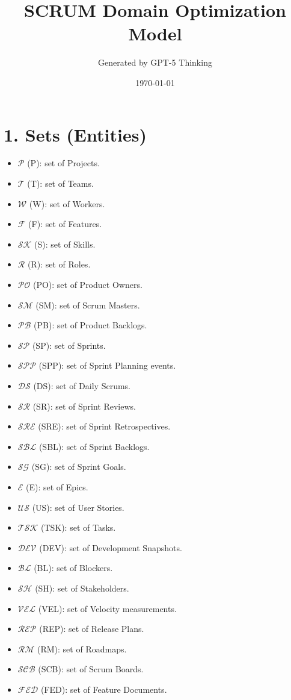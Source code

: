 \documentclass[11pt,a4paper]{article}
\title{SCRUM Domain Optimization Model}
\author{Generated by GPT-5 Thinking}
\date{\today}
\begin{document}
\maketitle
\tableofcontents
\newpage

\section{1. Sets (Entities)}
\begin{itemize}[leftmargin=1.2em]
  \item $\mathcal{P}$ (P): set of Projects.
  \item $\mathcal{T}$ (T): set of Teams.
  \item $\mathcal{W}$ (W): set of Workers.
  \item $\mathcal{F}$ (F): set of Features.
  \item $\mathcal{S\!K}$ (S): set of Skills.
  \item $\mathcal{R}$ (R): set of Roles.
  \item $\mathcal{PO}$ (PO): set of Product Owners.
  \item $\mathcal{SM}$ (SM): set of Scrum Masters.
  \item $\mathcal{PB}$ (PB): set of Product Backlogs.
  \item $\mathcal{SP}$ (SP): set of Sprints.
  \item $\mathcal{SPP}$ (SPP): set of Sprint Planning events.
  \item $\mathcal{DS}$ (DS): set of Daily Scrums.
  \item $\mathcal{SR}$ (SR): set of Sprint Reviews.
  \item $\mathcal{SRE}$ (SRE): set of Sprint Retrospectives.
  \item $\mathcal{SBL}$ (SBL): set of Sprint Backlogs.
  \item $\mathcal{SG}$ (SG): set of Sprint Goals.
  \item $\mathcal{E}$ (E): set of Epics.
  \item $\mathcal{US}$ (US): set of User Stories.
  \item $\mathcal{TSK}$ (TSK): set of Tasks.
  \item $\mathcal{DEV}$ (DEV): set of Development Snapshots.
  \item $\mathcal{BL}$ (BL): set of Blockers.
  \item $\mathcal{SH}$ (SH): set of Stakeholders.
  \item $\mathcal{VEL}$ (VEL): set of Velocity measurements.
  \item $\mathcal{REP}$ (REP): set of Release Plans.
  \item $\mathcal{RM}$ (RM): set of Roadmaps.
  \item $\mathcal{SCB}$ (SCB): set of Scrum Boards.
  \item $\mathcal{FED}$ (FED): set of Feature Documents.
\end{itemize}
\end{document}
